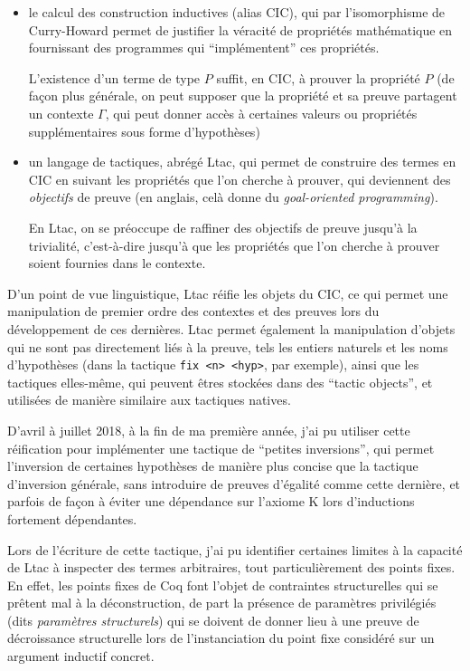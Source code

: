 \documentclass[]{easychair}
\begin{document}
\begin{itemize}
\item
  le calcul des construction inductives (alias CIC), qui par
  l'isomorphisme de Curry-Howard permet de justifier la véracité de
  propriétés mathématique en fournissant des programmes qui
  ``implémentent'' ces propriétés.

  L'existence d'un terme de type \(P\) suffit, en CIC, à prouver la
  propriété \(P\) (de façon plus générale, on peut supposer que la
  propriété et sa preuve partagent un contexte \(\Gamma\), qui peut
  donner accès à certaines valeurs ou propriétés supplémentaires sous
  forme d'hypothèses)
\item
  un langage de tactiques, abrégé Ltac, qui permet de construire des
  termes en CIC en suivant les propriétés que l'on cherche à prouver,
  qui deviennent des \emph{objectifs} de preuve (en anglais, celà donne
  du \emph{goal-oriented programming}).

  En Ltac, on se préoccupe de raffiner des objectifs de preuve jusqu'à
  la trivialité, c'est-à-dire jusqu'à que les propriétés que l'on
  cherche à prouver soient fournies dans le contexte.
\end{itemize}

D'un point de vue linguistique, Ltac réifie les objets du CIC, ce qui
permet une manipulation de premier ordre des contextes et des preuves
lors du développement de ces dernières. Ltac permet également la
manipulation d'objets qui ne sont pas directement liés à la preuve, tels
les entiers naturels et les noms d'hypothèses (dans la tactique
\texttt{fix\ \textless{}n\textgreater{}\ \textless{}hyp\textgreater{}},
par exemple), ainsi que les tactiques elles-même, qui peuvent êtres
stockées dans des ``tactic objects'', et utilisées de manière similaire
aux tactiques natives.

D'avril à juillet 2018, à la fin de ma première année, j'ai pu utiliser
cette réification pour implémenter une tactique de ``petites
inversions'', qui permet l'inversion de certaines hypothèses de manière
plus concise que la tactique d'inversion générale, sans introduire de
preuves d'égalité comme cette dernière, et parfois de façon à éviter une
dépendance sur l'axiome K lors d'inductions fortement dépendantes.

Lors de l'écriture de cette tactique, j'ai pu identifier certaines
limites à la capacité de Ltac à inspecter des termes arbitraires, tout
particulièrement des points fixes. En effet, les points fixes de Coq
font l'objet de contraintes structurelles qui se prêtent mal à la
déconstruction, de part la présence de paramètres privilégiés (dits
\emph{paramètres structurels}) qui se doivent de donner lieu à une
preuve de décroissance structurelle lors de l'instanciation du point
fixe considéré sur un argument inductif concret.
\end{document}
